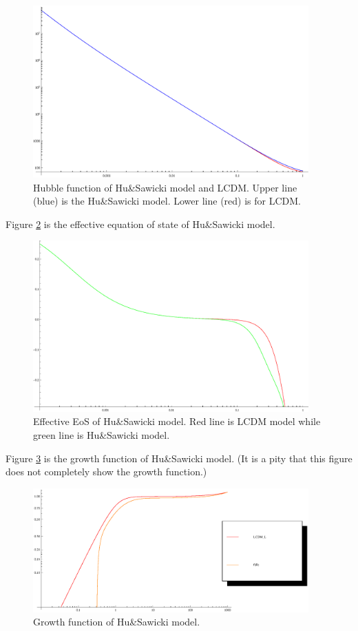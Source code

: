 \documentclass[12pt,a4paper]{article}
\begin{document}
\begin{figure}[!htpb]
\centering
\includegraphics[width=300pt]{HSMod-Hub.eps}
\caption{Hubble function of Hu\&Sawicki model and LCDM. Upper line (blue) is the Hu\&Sawicki model. Lower line (red) is for LCDM.}\label{Fig-HSMod-Bub}
\end{figure}


Figure \ref{Fig-HSMod-EoSEff} is the effective equation of state of Hu\&Sawicki model.

\begin{figure}[!htpb]
\centering
\includegraphics[width=300pt]{HSMod-EoSEff.eps}
\caption{Effective EoS of Hu\&Sawicki model. Red line is LCDM model while green line is Hu\&Sawicki model.}\label{Fig-HSMod-EoSEff}
\end{figure}


Figure \ref{Fig-HSMod-Growth} is the growth function of Hu\&Sawicki model. (It is a pity that this figure does not completely show the growth function.)

\begin{figure}[!htpb]
\centering
\includegraphics[width=300pt]{HSMod-Growth.eps}
\caption{Growth function of Hu\&Sawicki model.}\label{Fig-HSMod-Growth}
\end{figure}
\end{document}
